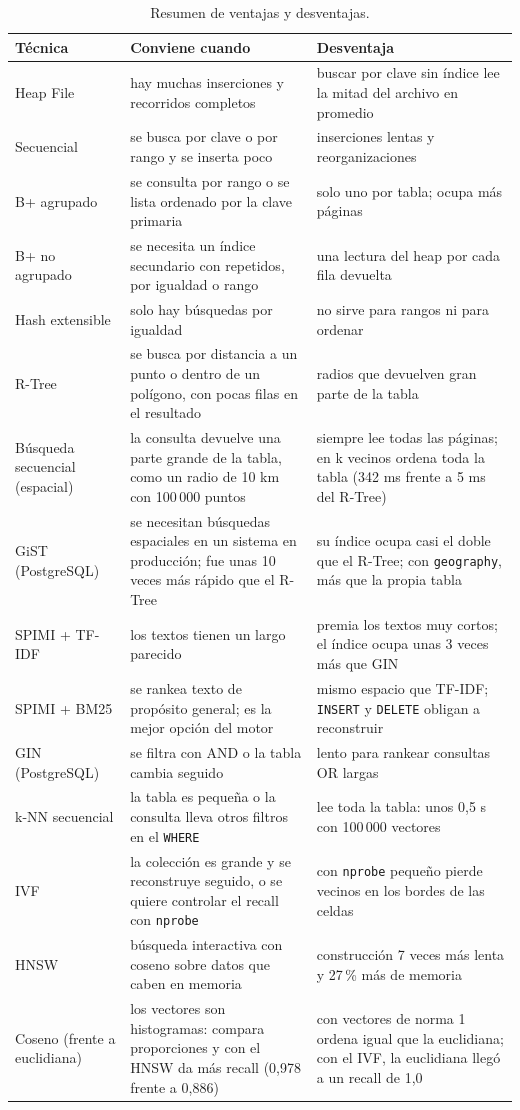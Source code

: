 \documentclass[11pt,a4paper]{article}
\begin{document}
\begin{table}[H]
\centering
\small
\begin{tabular}{>{\raggedright\arraybackslash}p{3cm}p{5.2cm}p{5.8cm}}
\toprule
Técnica & Conviene cuando & Desventaja \\
\midrule
Heap File & hay muchas inserciones y recorridos completos & buscar por clave sin índice lee la mitad del archivo en promedio \\
Secuencial & se busca por clave o por rango y se inserta poco & inserciones lentas y reorganizaciones \\
B+ agrupado & se consulta por rango o se lista ordenado por la clave primaria & solo uno por tabla; ocupa más páginas \\
B+ no agrupado & se necesita un índice secundario con repetidos, por igualdad o rango & una lectura del heap por cada fila devuelta \\
Hash extensible & solo hay búsquedas por igualdad & no sirve para rangos ni para ordenar \\
R-Tree & se busca por distancia a un punto o dentro de un polígono, con pocas filas en el resultado & radios que devuelven gran parte de la tabla \\
Búsqueda secuencial (espacial) & la consulta devuelve una parte grande de la tabla, como un radio de 10 km con 100\,000 puntos & siempre lee todas las páginas; en k vecinos ordena toda la tabla (342 ms frente a 5 ms del R-Tree) \\
GiST (PostgreSQL) & se necesitan búsquedas espaciales en un sistema en producción; fue unas 10 veces más rápido que el R-Tree & su índice ocupa casi el doble que el R-Tree; con \texttt{geography}, más que la propia tabla \\
SPIMI + TF-IDF & los textos tienen un largo parecido & premia los textos muy cortos; el índice ocupa unas 3 veces más que GIN \\
SPIMI + BM25 & se rankea texto de propósito general; es la mejor opción del motor & mismo espacio que TF-IDF; \texttt{INSERT} y \texttt{DELETE} obligan a reconstruir \\
GIN (PostgreSQL) & se filtra con AND o la tabla cambia seguido & lento para rankear consultas OR largas \\
k-NN secuencial & la tabla es pequeña o la consulta lleva otros filtros en el \texttt{WHERE} & lee toda la tabla: unos 0,5 s con 100\,000 vectores \\
IVF & la colección es grande y se reconstruye seguido, o se quiere controlar el recall con \texttt{nprobe} & con \texttt{nprobe} pequeño pierde vecinos en los bordes de las celdas \\
HNSW & búsqueda interactiva con coseno sobre datos que caben en memoria & construcción 7 veces más lenta y 27\,\% más de memoria \\
Coseno (frente a euclidiana) & los vectores son histogramas: compara proporciones y con el HNSW da más recall (0,978 frente a 0,886) & con vectores de norma 1 ordena igual que la euclidiana; con el IVF, la euclidiana llegó a un recall de 1,0 \\
\bottomrule
\end{tabular}
\caption{Resumen de ventajas y desventajas.}
\end{table}
\end{document}
